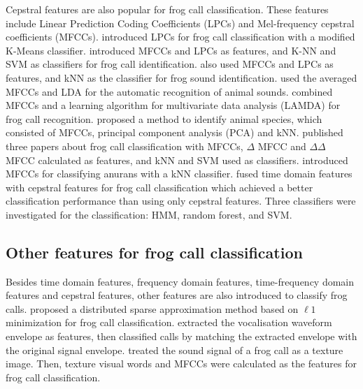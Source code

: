 Cepstral features are also popular for frog call classification. These features include Linear Prediction Coding Coefficients (LPCs) and Mel-frequency cepstral coefficients (MFCCs). 
\cite{colombia2009frogs} introduced LPCs for frog call classification with a modified K-Means classifier. \cite{jaafarcomparative} introduced MFCCs and LPCs as features, and K-NN and SVM as classifiers for frog call identification. \cite{yuan2012frog} also used MFCCs and LPCs as features, and kNN as the classifier for frog sound identification.
\cite{lee2006automatic} used the averaged MFCCs and LDA for the automatic recognition of animal sounds. \cite{bedoya2014automatic} combined MFCCs and a learning algorithm for multivariate data analysis (LAMDA) for frog call recognition. \cite{vaca2010using} proposed a method to identify animal species, which consisted of MFCCs, principal component analysis (PCA) and kNN. \cite{jaafar2013, jaafar2013mfcc, tanintelligent2014} published three papers about frog call classification with MFCCs, $\Delta$ MFCC and $\Delta \Delta$ MFCC calculated as features, and kNN and SVM used as classifiers. \cite{feature2012Colona} introduced MFCCs for classifying anurans with a kNN classifier. \cite{Noda2016100} fused time domain features with cepstral features for frog call classification which achieved a better classification performance than using only cepstral features. Three classifiers were investigated for the classification: HMM, random forest, and SVM.


\subsection{Other features for frog call classification}
Besides time domain features, frequency domain features, time-frequency domain features and cepstral features, other features are also introduced to classify frog calls.
\cite{wei2012distributed} proposed a distributed sparse approximation method based on $\ell 1$ minimization for frog call classification.  \cite{dang2008lightweight} extracted the vocalisation waveform envelope as features, then classified calls by matching the extracted envelope with the original signal envelope. \cite{kular2015classifying} treated the sound signal of a frog call as a texture image. Then, texture visual words and MFCCs were calculated as the features for frog call classification. 





